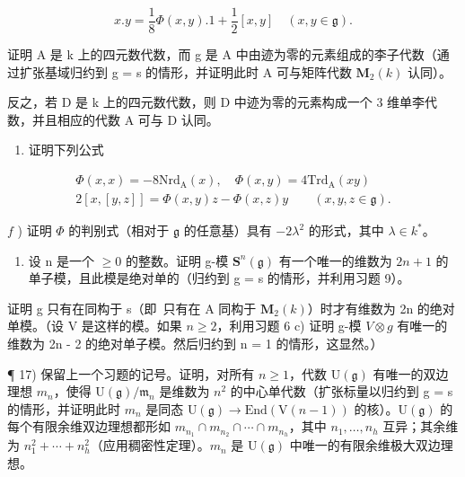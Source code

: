 \[
x. y = \frac {1}{8} \Phi (x, y). 1 + \frac {1}{2} [ x, y ] \quad (x, y \in \mathfrak {g}).
\]

证明 A 是 k 上的四元数代数，而 g 是 A 中由迹为零的元素组成的李子代数（通过扩张基域归约到 g = s 的情形，并证明此时 A 可与矩阵代数 \(\mathbf{M}_{2}(k)\) 认同）。

反之，若 D 是 k 上的四元数代数，则 D 中迹为零的元素构成一个 3 维单李代数，并且相应的代数 A 可与 D 认同。

\begin{enumerate}
\def\labelenumi{\alph{enumi})}
\setcounter{enumi}{4}
\tightlist
\item
  证明下列公式
\end{enumerate}

\[
\begin{array}{c} \Phi (x, x) = - 8 \mathrm{Nrd} _ {\mathrm{A}} (x), \quad \Phi (x, y) = 4 \mathrm{Trd} _ {\mathrm{A}} (x y) \\ 2 [ x, [ y, z ] ] = \Phi (x, y) z - \Phi (x, z) y \qquad (x, y, z \in \mathfrak {g}). \end{array}
\]

\(f\) ) 证明 \(\varPhi\) 的判别式（相对于 \(\mathfrak{g}\) 的任意基）具有 \(-2\lambda^2\) 的形式，其中 \(\lambda \in k^{*}\)。

\begin{enumerate}
\def\labelenumi{\alph{enumi})}
\setcounter{enumi}{6}
\tightlist
\item
  设 n 是一个 \(\geq 0\) 的整数。证明 g-模 \(\mathbf{S}^{n}(\mathfrak{g})\) 有一个唯一的维数为 \(2n + 1\) 的单子模，且此模是绝对单的（归约到 g = s 的情形，并利用习题 9）。
\end{enumerate}

证明 g 只有在同构于 s（即~只有在 A 同构于 \(\mathbf{M}_{2}(k)\)）时才有维数为 2n 的绝对单模。（设 V 是这样的模。如果 \(n \geq 2\)，利用习题 6 c) 证明 g-模 \(V \otimes g\) 有唯一的维数为 2n - 2 的绝对单子模。然后归约到 n = 1 的情形，这显然。）

¶ 17) 保留上一个习题的记号。证明，对所有 \(n \geq 1\)，代数 \(\mathrm{U}(\mathfrak{g})\) 有唯一的双边理想 \(m_{n}\)，使得 \(\mathrm{U}(\mathfrak{g}) / \mathfrak{m}_{n}\) 是维数为 \(n^{2}\) 的中心单代数（扩张标量以归约到 g = s 的情形，并证明此时 \(m_{n}\) 是同态 \(\mathrm{U}(\mathfrak{g}) \to \mathrm{End}(\mathrm{V}(n-1))\) 的核）。\(\mathrm{U}(\mathfrak{g})\) 的每个有限余维双边理想都形如 \(m_{n_{1}} \cap m_{n_{2}} \cap \cdots \cap m_{n_{h}}\)，其中 \(n_{1}, \ldots, n_{h}\) 互异；其余维为 \(n_{1}^{2} + \cdots + n_{h}^{2}\)（应用稠密性定理）。\(m_{n}\) 是 \(\mathrm{U}(\mathfrak{g})\) 中唯一的有限余维极大双边理想。


